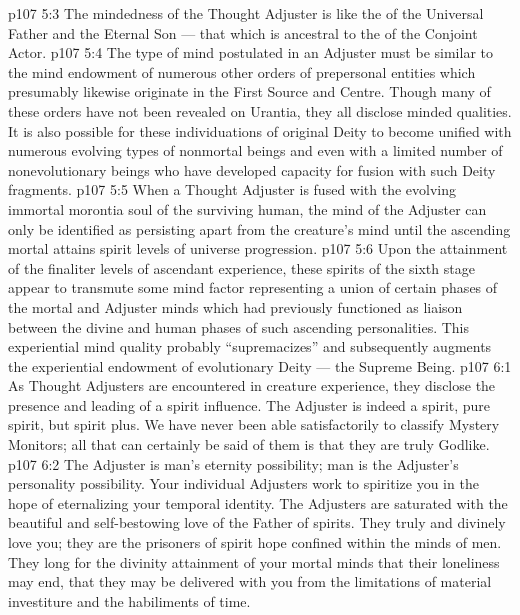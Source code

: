 \vs p107 5:3 The mindedness of the Thought Adjuster is like the  of the Universal Father and the Eternal Son --- that which is ancestral to the  of the Conjoint Actor.
\vs p107 5:4 The type of mind postulated in an Adjuster must be similar to the mind endowment of numerous other orders of prepersonal entities which presumably likewise originate in the First Source and Centre. Though many of these orders have not been revealed on Urantia, they all disclose minded qualities. It is also possible for these individuations of original Deity to become unified with numerous evolving types of nonmortal beings and even with a limited number of nonevolutionary beings who have developed capacity for fusion with such Deity fragments.
\vs p107 5:5 When a Thought Adjuster is fused with the evolving immortal morontia soul of the surviving human, the mind of the Adjuster can only be identified as persisting apart from the creature’s mind until the ascending mortal attains spirit levels of universe progression.
\vs p107 5:6 Upon the attainment of the finaliter levels of ascendant experience, these spirits of the sixth stage appear to transmute some mind factor representing a union of certain phases of the mortal and Adjuster minds which had previously functioned as liaison between the divine and human phases of such ascending personalities. This experiential mind quality probably “supremacizes” and subsequently augments the experiential endowment of evolutionary Deity --- the Supreme Being.
\vs p107 6:1 As Thought Adjusters are encountered in creature experience, they disclose the presence and leading of a spirit influence. The Adjuster is indeed a spirit, pure spirit, but spirit plus. We have never been able satisfactorily to classify Mystery Monitors; all that can certainly be said of them is that they are truly Godlike.
\vs p107 6:2 The Adjuster is man’s eternity possibility; man is the Adjuster’s personality possibility. Your individual Adjusters work to spiritize you in the hope of eternalizing your temporal identity. The Adjusters are saturated with the beautiful and self\hyp{}bestowing love of the Father of spirits. They truly and divinely love you; they are the prisoners of spirit hope confined within the minds of men. They long for the divinity attainment of your mortal minds that their loneliness may end, that they may be delivered with you from the limitations of material investiture and the habiliments of time.

